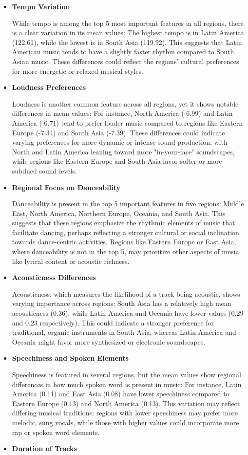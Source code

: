 \begin{itemize}
    \item\textbf{Tempo Variation}
    
While tempo is among the top 5 most important features in all regions, there is a clear variation in its mean values:
The highest tempo is in Latin America (122.61), while the lowest is in South Asia (119.92).
This suggests that Latin American music tends to have a slightly faster rhythm compared to South Asian music. These differences could reflect the regions' cultural preferences for more energetic or relaxed musical styles.
\item\textbf{Loudness Preferences}

Loudness is another common feature across all regions, yet it shows notable differences in mean values:
For instance, North America (-6.99) and Latin America (-6.71) tend to prefer louder music compared to regions like Eastern Europe (-7.34) and South Asia (-7.39).
These differences could indicate varying preferences for more dynamic or intense sound production, with North and Latin America leaning toward more "in-your-face" soundscapes, while regions like Eastern Europe and South Asia favor softer or more subdued sound levels.
\item\textbf{Regional Focus on Danceability}

Danceability is present in the top 5 important features in five regions: Middle East, North America, Northern Europe, Oceania, and South Asia.
This suggests that these regions emphasize the rhythmic elements of music that facilitate dancing, perhaps reflecting a stronger cultural or social inclination towards dance-centric activities. Regions like Eastern Europe or East Asia, where danceability is not in the top 5, may prioritize other aspects of music like lyrical content or acoustic richness.
\item\textbf{Acousticness Differences}

Acousticness, which measures the likelihood of a track being acoustic, shows varying importance across regions:
South Asia has a relatively high mean acousticness (0.36), while Latin America and Oceania have lower values (0.29 and 0.23 respectively).
This could indicate a stronger preference for traditional, organic instruments in South Asia, whereas Latin America and Oceania might favor more synthesized or electronic soundscapes.
\item\textbf{Speechiness and Spoken Elements}

Speechiness is featured in several regions, but the mean values show regional differences in how much spoken word is present in music:
For instance, Latin America (0.11) and East Asia (0.08) have lower speechiness compared to Eastern Europe (0.13) and North America (0.13).
This variation may reflect differing musical traditions: regions with lower speechiness may prefer more melodic, sung vocals, while those with higher values could incorporate more rap or spoken word elements.
\item\textbf{Duration of Tracks}


\end{itemize}

